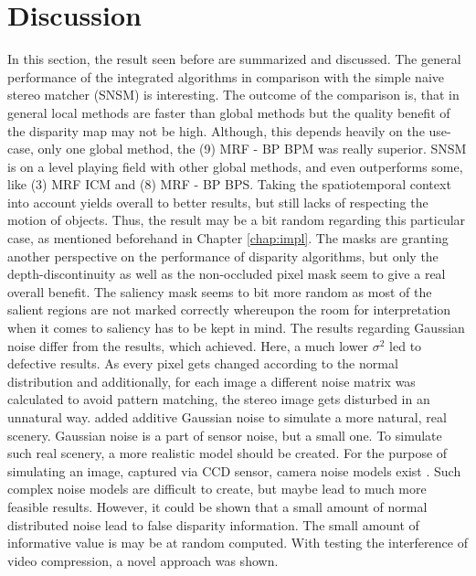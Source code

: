 \section{Discussion}

In this section, the result seen before are summarized and discussed.
The general performance of the integrated algorithms in comparison with the simple naive stereo matcher (SNSM) is interesting.
The outcome of the comparison is, that in general local methods are faster than global methods but the quality benefit of the disparity map may not be high.
Although, this depends heavily on the use-case, only one global method, the (9) MRF - BP BPM was really superior.
SNSM is on a level playing field with other global methods, and even outperforms some, like (3) MRF ICM and (8) MRF - BP BPS.
Taking the spatiotemporal context into account yields overall to better results, but still lacks of respecting the motion of objects.
Thus, the result may be a bit random regarding this particular case, as mentioned beforehand in Chapter \ref{chap:impl}.
The masks are granting another perspective on the performance of disparity algorithms, but only the depth-discontinuity as well as the non-occluded pixel mask seem to give a real overall benefit.
The saliency mask seems to bit more random as most of the salient regions are not marked correctly whereupon the room for interpretation when it comes to saliency has to be kept in mind.
\newline\newline\noindent The results regarding Gaussian noise differ from the results, which \citeauthor{richardt2010real} \citep{richardt2010real} achieved.
Here, a much lower $\sigma^2$ led to defective results.
As every pixel gets changed according to the normal distribution and additionally, for each image a different noise matrix was calculated to avoid pattern matching, the stereo image gets disturbed in an unnatural way.
\citeauthor{richardt2010real} added additive Gaussian noise to simulate a more natural, real scenery.
Gaussian noise is a part of sensor noise, but a small one.
To simulate such real scenery, a more realistic model should be created.
For the purpose of simulating an image, captured via CCD sensor, camera noise models exist \citep{liu2006noise}.
Such complex noise models are difficult to create, but maybe lead to much more feasible results.
However, it could be shown that a small amount of normal distributed noise lead to false disparity information.
The small amount of informative value is may be at random computed.
\newline\newline\noindent With testing the interference of video compression, a novel approach was shown.
